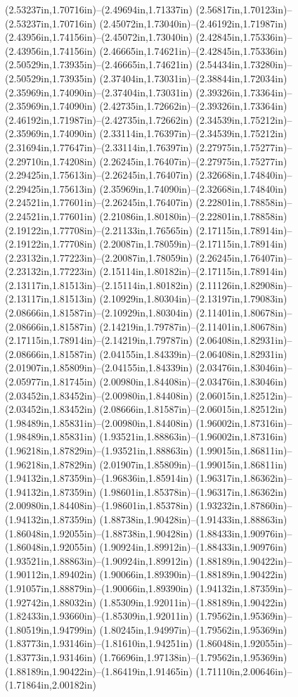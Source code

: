 (2.53237in,1.70716in)--(2.49694in,1.71337in) (2.56817in,1.70123in)--(2.53237in,1.70716in) (2.45072in,1.73040in)--(2.46192in,1.71987in) (2.43956in,1.74156in)--(2.45072in,1.73040in) (2.42845in,1.75336in)--(2.43956in,1.74156in) (2.46665in,1.74621in)--(2.42845in,1.75336in) (2.50529in,1.73935in)--(2.46665in,1.74621in) (2.54434in,1.73280in)--(2.50529in,1.73935in) (2.37404in,1.73031in)--(2.38844in,1.72034in) (2.35969in,1.74090in)--(2.37404in,1.73031in) (2.39326in,1.73364in)--(2.35969in,1.74090in) (2.42735in,1.72662in)--(2.39326in,1.73364in) (2.46192in,1.71987in)--(2.42735in,1.72662in) (2.34539in,1.75212in)--(2.35969in,1.74090in) (2.33114in,1.76397in)--(2.34539in,1.75212in) (2.31694in,1.77647in)--(2.33114in,1.76397in) (2.27975in,1.75277in)--(2.29710in,1.74208in) (2.26245in,1.76407in)--(2.27975in,1.75277in) (2.29425in,1.75613in)--(2.26245in,1.76407in) (2.32668in,1.74840in)--(2.29425in,1.75613in) (2.35969in,1.74090in)--(2.32668in,1.74840in) (2.24521in,1.77601in)--(2.26245in,1.76407in) (2.22801in,1.78858in)--(2.24521in,1.77601in) (2.21086in,1.80180in)--(2.22801in,1.78858in) (2.19122in,1.77708in)--(2.21133in,1.76565in) (2.17115in,1.78914in)--(2.19122in,1.77708in) (2.20087in,1.78059in)--(2.17115in,1.78914in) (2.23132in,1.77223in)--(2.20087in,1.78059in) (2.26245in,1.76407in)--(2.23132in,1.77223in) (2.15114in,1.80182in)--(2.17115in,1.78914in) (2.13117in,1.81513in)--(2.15114in,1.80182in) (2.11126in,1.82908in)--(2.13117in,1.81513in) (2.10929in,1.80304in)--(2.13197in,1.79083in) (2.08666in,1.81587in)--(2.10929in,1.80304in) (2.11401in,1.80678in)--(2.08666in,1.81587in) (2.14219in,1.79787in)--(2.11401in,1.80678in) (2.17115in,1.78914in)--(2.14219in,1.79787in) (2.06408in,1.82931in)--(2.08666in,1.81587in) (2.04155in,1.84339in)--(2.06408in,1.82931in) (2.01907in,1.85809in)--(2.04155in,1.84339in) (2.03476in,1.83046in)--(2.05977in,1.81745in) (2.00980in,1.84408in)--(2.03476in,1.83046in) (2.03452in,1.83452in)--(2.00980in,1.84408in) (2.06015in,1.82512in)--(2.03452in,1.83452in) (2.08666in,1.81587in)--(2.06015in,1.82512in) (1.98489in,1.85831in)--(2.00980in,1.84408in) (1.96002in,1.87316in)--(1.98489in,1.85831in) (1.93521in,1.88863in)--(1.96002in,1.87316in) (1.96218in,1.87829in)--(1.93521in,1.88863in) (1.99015in,1.86811in)--(1.96218in,1.87829in) (2.01907in,1.85809in)--(1.99015in,1.86811in) (1.94132in,1.87359in)--(1.96836in,1.85914in) (1.96317in,1.86362in)--(1.94132in,1.87359in) (1.98601in,1.85378in)--(1.96317in,1.86362in) (2.00980in,1.84408in)--(1.98601in,1.85378in) (1.93232in,1.87860in)--(1.94132in,1.87359in) (1.88738in,1.90428in)--(1.91433in,1.88863in) (1.86048in,1.92055in)--(1.88738in,1.90428in) (1.88433in,1.90976in)--(1.86048in,1.92055in) (1.90924in,1.89912in)--(1.88433in,1.90976in) (1.93521in,1.88863in)--(1.90924in,1.89912in) (1.88189in,1.90422in)--(1.90112in,1.89402in) (1.90066in,1.89390in)--(1.88189in,1.90422in) (1.91057in,1.88879in)--(1.90066in,1.89390in) (1.94132in,1.87359in)--(1.92742in,1.88032in) (1.85309in,1.92011in)--(1.88189in,1.90422in) (1.82433in,1.93660in)--(1.85309in,1.92011in) (1.79562in,1.95369in)--(1.80519in,1.94799in) (1.80245in,1.94997in)--(1.79562in,1.95369in) (1.83773in,1.93146in)--(1.81610in,1.94251in) (1.86048in,1.92055in)--(1.83773in,1.93146in) (1.76696in,1.97138in)--(1.79562in,1.95369in) (1.88189in,1.90422in)--(1.86419in,1.91465in) (1.71110in,2.00646in)--(1.71864in,2.00182in) 